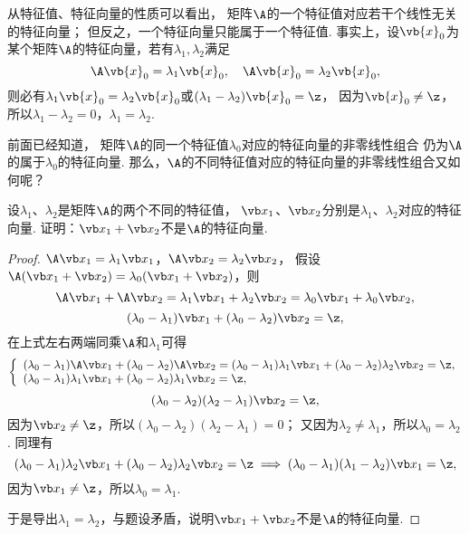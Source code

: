 从特征值、特征向量的性质可以看出，
矩阵\(\A\)的一个特征值对应若干个线性无关的特征向量；
但反之，一个特征向量只能属于一个特征值.
事实上，设\(\vb{x}_0\)为某个矩阵\(\A\)的特征向量，若有\(\lambda_1,\lambda_2\)满足\[
	\A\vb{x}_0=\lambda_1\vb{x}_0,
	\quad
	\A\vb{x}_0=\lambda_2\vb{x}_0,
\]
则必有\(\lambda_1\vb{x}_0=\lambda_2\vb{x}_0\)或\((\lambda_1-\lambda_2)\vb{x}_0=\z\)，
因为\(\vb{x}_0\neq\z\)，所以\(\lambda_1-\lambda_2=0\)，\(\lambda_1=\lambda_2\).

前面已经知道，
矩阵\(\A\)的同一个特征值\(\lambda_0\)对应的特征向量的非零线性组合
仍为\(\A\)的属于\(\lambda_0\)的特征向量.
那么，\(\A\)的不同特征值对应的特征向量的非零线性组合又如何呢？
\begin{example}
设\(\lambda_1\)、\(\lambda_2\)是矩阵\(\A\)的两个不同的特征值，
\(\x_1\)、\(\x_2\)分别是\(\lambda_1\)、\(\lambda_2\)对应的特征向量.
证明：\(\x_1+\x_2\)不是\(\A\)的特征向量.
\begin{proof}
\(\A\x_1 = \lambda_1\x_1\)，\(\A\x_2 = \lambda_2\x_2\)，
假设\(\A(\x_1+\x_2) = \lambda_0(\x_1+\x_2)\)，则\[
	\A\x_1+\A\x_2 =\lambda_1\x_1+\lambda_2\x_2 = \lambda_0\x_1+\lambda_0\x_2,
\]\[
	(\lambda_0-\lambda_1)\x_1+(\lambda_0-\lambda_2)\x_2 = \z,
\]
在上式左右两端同乘\(\A\)和\(\lambda_1\)可得\[
	\left\{ \begin{array}{l}
		(\lambda_0-\lambda_1)\A\x_1+(\lambda_0-\lambda_2)\A\x_2 = (\lambda_0-\lambda_1)\lambda_1\x_1 + (\lambda_0-\lambda_2)\lambda_2\x_2 = \z, \\
		(\lambda_0-\lambda_1)\lambda_1\x_1+(\lambda_0-\lambda_2)\lambda_1\x_2 = \z,
	\end{array} \right.
\]\[
	(\lambda_0-\lambda_2)(\lambda_2-\lambda_1)\x_2 = \z,
\]
因为\(\x_2\neq\z\)，所以\((\lambda_0-\lambda_2)(\lambda_2-\lambda_1)=0\)；
又因为\(\lambda_2\neq\lambda_1\)，所以\(\lambda_0=\lambda_2\).
同理有\[
	(\lambda_0-\lambda_1)\lambda_2\x_1+(\lambda_0-\lambda_2)\lambda_2\x_2 = \z
	\implies
	(\lambda_0-\lambda_1)(\lambda_1-\lambda_2)\x_1 = \z,
\]
因为\(\x_1\neq\z\)，所以\(\lambda_0=\lambda_1\).

于是导出\(\lambda_1=\lambda_2\)，与题设矛盾，说明\(\x_1+\x_2\)不是\(\A\)的特征向量.
\end{proof}
\end{example}

